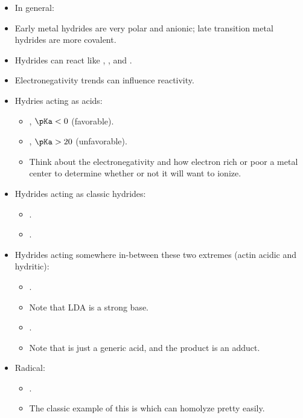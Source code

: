 \documentclass[../notes.tex]{subfiles}
\begin{document}
\begin{itemize}
    \begin{itemize}
        \item In general: 
        \item Early metal hydrides are very polar and anionic; late transition metal hydrides are more covalent.
        \item Hydrides can react like , , and .
        \item Electronegativity trends can influence reactivity.
        \item Hydries acting as acids:
        \begin{itemize}
            \item {}, $\pKa<0$ (favorable).
            \item {}, $\pKa>20$ (unfavorable).
            \item Think about the electronegativity and how electron rich or poor a metal center to determine whether or not it will want to ionize.
        \end{itemize}
        \item Hydrides acting as classic hydrides:
        \begin{itemize}
            \item {}.
            \item {}.
        \end{itemize}
        \item Hydrides acting somewhere in-between these two extremes (actin acidic and hydritic):
        \begin{itemize}
            \item {}.
            \item Note that LDA is a strong base.
            \item {}.
            \item Note that  is just a generic acid, and the product is an  adduct.
        \end{itemize}
        \item Radical:
        \begin{itemize}
            \item {}.
            \item The classic example of this is  which can homolyze pretty easily.

\end{itemize}
\end{itemize}
\end{itemize}
\end{document}
